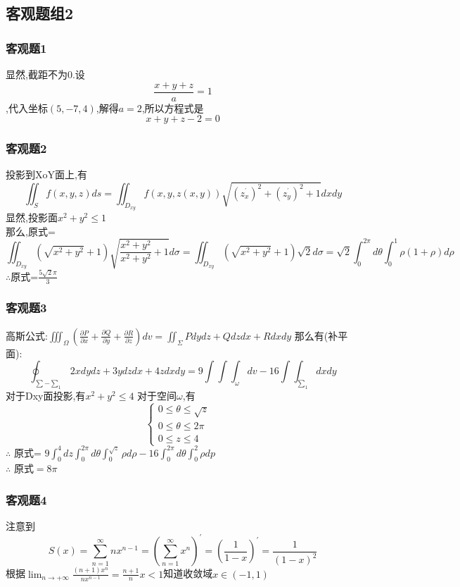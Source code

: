 \documentclass[a4paper,12pt]{ctexrep}
\begin{document}
\newpage

\subsection{客观题组2}
\subsubsection{客观题1}
显然,截距不为0.设
$$ \frac{x + y + z}{a} = 1 $$,代入坐标$(5,-7,4)$,解得$a=2$,所以方程式是$$x+y+z-2=0$$

\subsubsection{客观题2}
投影到XoY面上,有
$$\iint_Sf(x,y,z)ds=\iint_{D_{xy}}f(x,y,z(x,y))\sqrt{(z_x^{^{\prime}})^2+(z_y^{^{\prime}})^2+1}dxdy$$
显然,投影面$x^{2} + y^{2} \leq  1$ \\
那么,原式=$$\iint_{D_{xy}}(\sqrt{x^{2}+y^{2}}+1)\sqrt{\frac{x^{2}+y^{2}}{x^{2}+y^{2}}+1}d\sigma = \iint_{D_{xy}}(\sqrt{x^{2}+y^{2}}+1)\sqrt{2}d\sigma
=\sqrt{2}\int_{0}^{2\pi}d\theta\int_{0}^{1}\rho(1+\rho)d\rho$$
$\therefore $原式=$\frac{5 \sqrt{2} \pi}{3}$



\subsubsection{客观题3}
高斯公式:$\iiint_{\Omega}(\frac{\partial P}{\partial x}+\frac{\partial Q}{\partial y}+\frac{\partial R}{\partial z})dv=\iint_{\Sigma}Pdydz+Qdzdx+Rdxdy$
那么有(补平面):
$$\oint_{\sum-\sum_{1}}2xdydz+3ydzdx+4zdxdy=9\int\int\int_{\omega}dv-16\int\int_{\sum_{1}}dxdy$$
对于Dxy面投影,有$x^{2}+y^{2}\leq4$
对于空间$\omega$,有
$$\begin{cases}0\leq \theta\leq\sqrt{z}\\0\leq\theta\leq2\pi\\0\leq z\leq4&\end{cases}$$
$\therefore$ 原式= $9\int_{0}^{4}dz\int_{0}^{2\pi}d\theta\int_{0}^{\sqrt{z}}\rho d\rho-16\int_{0}^{2\pi}d\theta\int_{0}^{2}\rho dp$\\
$\therefore$ 原式$=8\pi$

\subsubsection{客观题4}
注意到$$S(x)=\sum_{n=1}^{\infty}nx^{n-1}=(\sum_{n=1}^{\infty}x^{n})^{\prime}=(\frac{1}{1-x})^{\prime}=\frac{1}{(1-x)^{2}}$$
根据$\lim_{n\to+\infty}\frac{(n+1)x^{n}}{nx^{n-1}}=\frac{n+1}{n}x<1$知道收敛域$x \in (-1,1)$
\end{document}
